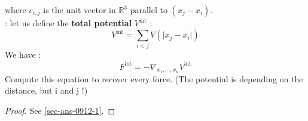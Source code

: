 \documentclass{report}
\newcommand*{\definition}[1]{\noindent\textbf{\color{cadmiumgreen}{#1}}}
\theoremstyle{plain}
\theoremstyle{definition}
\theoremstyle{remark}
\begin{document}
where $e_{i,j}$ is the unit vector in $\mathbb{R}^3$ parallel to $(x_j - x_i)$. \\
\definition{Total potential} : let us define the \textbf{total potential} $V^{\text{int}}$ :
\begin{equation}
V^{\text{int}} = \sum_{i<j}V(\vert x_j - x_i \vert)
\end{equation}
We have :
\begin{equation}
F^{\text{int}} = - \nabla_{x_1,\cdots,x_n}V^{\text{int}}
\end{equation}
Compute this equation to recover every force. 
(The potential is depending on the distance, but i and j !) 

\begin{proof}  \label{sec-q-0912-1}
See \ref{sec-ans-0912-1}.
\end{proof}
\end{document}
